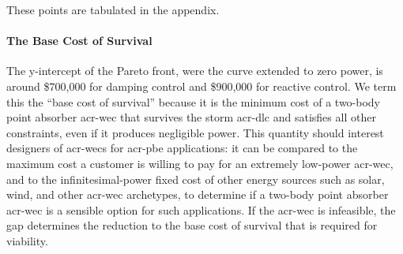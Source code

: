 

These points are tabulated in the appendix.

\paragraph{The Base Cost of Survival}
The y-intercept of the Pareto front, were the curve extended to zero power, is around \$700,000 for damping control and \$900,000 for reactive control.
We term this the ``base cost of survival'' because it is the minimum cost of a two-body point absorber \gls{acr-wec} that survives the storm \gls{acr-dlc} and satisfies all other constraints, even if it produces negligible power.
This quantity should interest designers of \glspl{acr-wec} for \gls{acr-pbe} applications:
it can be compared to the maximum cost a customer is willing to pay for an extremely low-power \gls{acr-wec},
and to the infinitesimal-power fixed cost of other energy sources such as solar, wind, and other \gls{acr-wec} archetypes, to determine if a two-body point absorber \gls{acr-wec} is a sensible option for such applications.
If the \gls{acr-wec} is infeasible, the gap determines the reduction to the base cost of survival that is required for viability.


